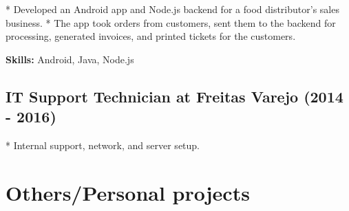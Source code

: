 * Developed an Android app and Node.js backend for a food distributor's sales business.
* The app took orders from customers, sent them to the backend for processing, generated invoices, and printed tickets for the customers.

\textbf{Skills:} Android, Java, Node.js

\subsection{IT Support Technician at Freitas Varejo (2014 - 2016)}

* Internal support, network, and server setup.

\section{Others/Personal projects}